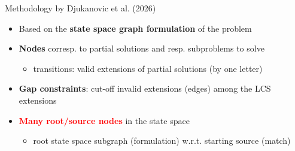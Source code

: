 \documentclass{beamer}
\begin{document}
\begin{frame}{Methodology by Djukanovic et al. (2026) }
	
	
    \begin{itemize}
        \item Based on the \textbf{state space graph formulation} of the problem \vspace{0.3cm}
        \item \textbf{Nodes} corresp. to partial solutions and resp. subproblems to solve
        \begin{itemize}
        	\item transitions: valid extensions of partial solutions (by one letter)
        \end{itemize} \vspace{0.3cm}
        \item \textbf{Gap constraints}: cut-off invalid extensions (edges) among the LCS extensions \vspace{0.3cm}
        \item \textcolor{red}{\textbf{Many root/source nodes}} in the state space%
        \begin{itemize}
        	\item   root state space subgraph (formulation) w.r.t. starting source (match)
        \end{itemize} 
    \end{itemize}
    
\end{frame}
\end{document}
